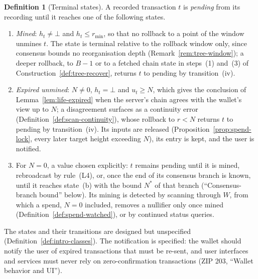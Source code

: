 \documentclass[11pt,a4paper]{article}
\theoremstyle{definition}
\newtheorem{definition}[theorem]{Definition}
\begin{document}
\begin{definition}[Terminal states]\label{def:life-states}
A recorded transaction $t$ is \emph{pending} from its recording until it
reaches one of the following states.
\begin{enumerate}[label=(\alph*)]
\item \emph{Mined}: $h_t \ne \bot$ and $h_t \le r_{\min}$, so that no
  rollback to a point of the window unmines $t$. The state is terminal
  relative to the rollback window only, since consensus bounds no
  reorganisation depth (Remark~\ref{rem:tree-window}); a deeper rollback,
  to $B - 1$ or to a fetched chain state in steps~(1) and~(3) of
  Construction~\ref{def:tree-recover}, returns $t$ to pending by
  transition~(iv).
\item \emph{Expired unmined}: $N \ne 0$, $h_t = \bot$ and $u_t \ge N$,
  which gives the conclusion of Lemma~\ref{lem:life-expired} when the
  server's chain agrees with the wallet's view up to $N$; a disagreement
  surfaces as a continuity error (Definition~\ref{def:scan-continuity}),
  whose rollback to $r < N$ returns $t$ to pending by transition~(iv). Its
  inputs are released
  (Proposition~\ref{prop:spend-lock}, every later target height exceeding
  $N$), its entry is kept, and the user is notified.
\item For $N = 0$, a value chosen explicitly: $t$ remains pending until it
  is mined, rebroadcast by rule~(L4), or, once the end of its consensus
  branch is known, until it reaches state~(b) with the bound $N^{*}$ of
  that branch (``Consensus-branch bound'' below). Its mining is detected by
  scanning through $W$, from which a spend, $N = 0$ included, removes a
  nullifier only once mined (Definition~\ref{def:spend-watched}), or by
  continued status queries.
\end{enumerate}
The states and their transitions are designed but unspecified
(Definition~\ref{def:intro-classes}). The notification is specified: the
wallet should notify the user of expired transactions that must be re-sent,
and user interfaces and services must never rely on zero-confirmation
transactions (ZIP 203, ``Wallet behavior and UI'').
\end{definition}
\end{document}
